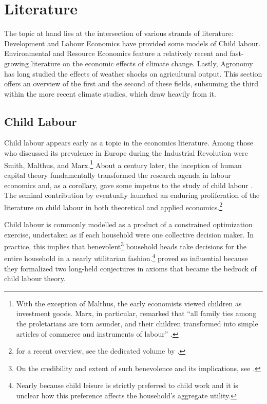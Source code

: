 \documentclass[a4paper,12pt]{article}
\theoremstyle{plain}
\theoremstyle{definition}
\theoremstyle{definition}
\theoremstyle{definition}
\theoremstyle{definition}
\begin{document}
\section{Literature}
\label{sec:literature}
The topic at hand lies at the intersection of various strands of literature: Development and Labour Economics have provided some models of Child labour. Environmental and Resource Economics feature a relatively recent and fast-growing literature on the economic effects of climate change. Lastly, Agronomy has long studied the effects of weather shocks on agricultural output. This section offers an overview of the first and the second of these fields, subsuming the third within the more recent climate studies, which draw heavily from it.

\subsection{Child Labour}
\label{sub:child_labour}
Child labour appears early as a topic in the economics literature. Among those who discussed its prevalence in Europe during the Industrial Revolution were Smith, Malthus, and Marx.\footnote{With the exception of Malthus, the early economists viewed children as investment goods. Marx, in particular, remarked that ``all family ties among the proletarians are torn asunder, and their children transformed into simple articles of commerce and instruments of labour'' \citep{Marx1848}.} About a century later, the inception of human capital theory \citep{Mincer1958, Schultz1961, Becker1964} fundamentally transformed the research agenda in labour economics and, as a corollary, gave some impetus to the study of child labour \citep[see e.g.][]{Rosenzweig1977}. The seminal contribution by \citet{Basu1998} eventually launched an enduring proliferation of the literature on child labour \citep{Edmonds2007} in both  theoretical and applied economics.\footnote{for a recent overview, see the dedicated volume by \citet{Posso2020}.}

Child labour is commonly modelled as a product of a constrained optimization exercise, undertaken as if each household were one collective decision maker. In practice, this implies that benevolent\footnote{On the credibility and extent of such benevolence and its implications, see \citet{Bhalotra2002}.} household heads take decisions for the entire household in a nearly utilitarian fashion.\footnote{Nearly because child leisure is strictly preferred to child work and it is unclear how this preference affects the household's aggregate utility.} \citet{Basu1998} proved so influential because they formalized two long-held conjectures in axioms that became the bedrock of child labour theory.
\end{document}
